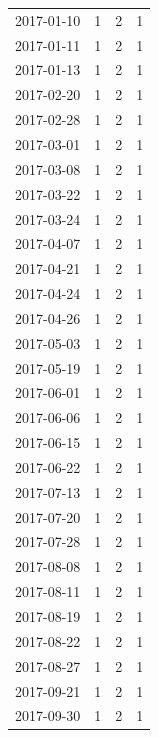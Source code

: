 \begin{tabular}{lrrr}
2017-01-10 & 1 & 2 & 1 \\
2017-01-11 & 1 & 2 & 1 \\
2017-01-13 & 1 & 2 & 1 \\
2017-02-20 & 1 & 2 & 1 \\
2017-02-28 & 1 & 2 & 1 \\
2017-03-01 & 1 & 2 & 1 \\
2017-03-08 & 1 & 2 & 1 \\
2017-03-22 & 1 & 2 & 1 \\
2017-03-24 & 1 & 2 & 1 \\
2017-04-07 & 1 & 2 & 1 \\
2017-04-21 & 1 & 2 & 1 \\
2017-04-24 & 1 & 2 & 1 \\
2017-04-26 & 1 & 2 & 1 \\
2017-05-03 & 1 & 2 & 1 \\
2017-05-19 & 1 & 2 & 1 \\
2017-06-01 & 1 & 2 & 1 \\
2017-06-06 & 1 & 2 & 1 \\
2017-06-15 & 1 & 2 & 1 \\
2017-06-22 & 1 & 2 & 1 \\
2017-07-13 & 1 & 2 & 1 \\
2017-07-20 & 1 & 2 & 1 \\
2017-07-28 & 1 & 2 & 1 \\
2017-08-08 & 1 & 2 & 1 \\
2017-08-11 & 1 & 2 & 1 \\
2017-08-19 & 1 & 2 & 1 \\
2017-08-22 & 1 & 2 & 1 \\
2017-08-27 & 1 & 2 & 1 \\
2017-09-21 & 1 & 2 & 1 \\
2017-09-30 & 1 & 2 & 1 \\
\bottomrule
\end{tabular}
